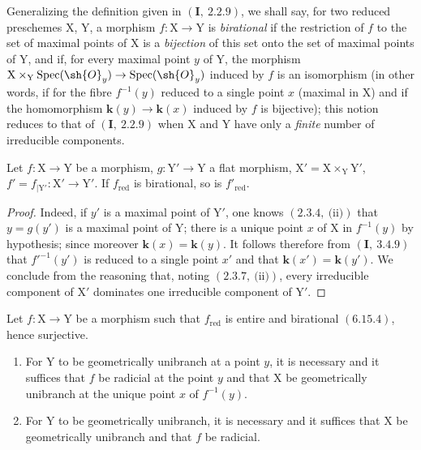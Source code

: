 \begin{env}[6.15.4]
\label{IV.6.15.4}
Generalizing the definition given in $(\mathbf{I},~2.2.9)$, we shall say,
for two reduced preschemes $\mathrm{X}$, $\mathrm{Y}$, a morphism $f:\mathrm{X}\to\mathrm{Y}$ is \emph{birational} if the restriction
of $f$ to the set of maximal points of $\mathrm{X}$ is a \emph{bijection} of this set onto
the set of maximal points of $\mathrm{Y}$, and if, for every maximal point $y$ of $\mathrm{Y}$, the
morphism $\mathrm{X}\times_\mathrm{Y}\operatorname{Spec}(\sh{O}_y)\to\operatorname{Spec}(\sh{O}_y)$ induced by $f$ is an isomorphism (in other words,
if for the fibre $f^{-1}(y)$ reduced to a single point $x$ (maximal in $\mathrm{X}$) and if the homomorphism
$\boldsymbol{k}(y)\to\boldsymbol{k}(x)$ induced by $f$ is bijective); this notion reduces to that of $(\mathbf{I},~2.2.9)$ when $\mathrm{X}$
and $\mathrm{Y}$ have only a \emph{finite} number of irreducible components.
\end{env}

\begin{lemma}[6.15.4.1]
\label{IV.6.15.4.1}
Let $f:\mathrm{X}\to\mathrm{Y}$ be a morphism, $g:\mathrm{Y}'\to\mathrm{Y}$ a flat morphism,
$\mathrm{X}'=\mathrm{X}\times_\mathrm{Y}\mathrm{Y}'$, $f'=f_{|\mathrm{Y}'}:\mathrm{X}'\to\mathrm{Y}'$. If $f_{\mathrm{red}}$ is birational, so is $f'_{\mathrm{red}}$.
\end{lemma}

\begin{proof}
Indeed, if $y'$ is a maximal point of $\mathrm{Y}'$, one knows $(2.3.4,~\text{(ii)})$ that $y=g(y')$ is
a maximal point of $\mathrm{Y}$; there is a unique point $x$ of $\mathrm{X}$ in $f^{-1}(y)$ by hypothesis; since moreover
$\boldsymbol{k}(x)=\boldsymbol{k}(y)$. It follows therefore from $(\mathbf{I},~3.4.9)$ that
$f'^{-1}(y')$ is reduced to a single point $x'$ and that $\boldsymbol{k}(x')=\boldsymbol{k}(y')$. We conclude from the reasoning
that, noting $(2.3.7,~\text{(ii)})$, every irreducible component of $\mathrm{X}'$ dominates
one irreducible component of $\mathrm{Y}'$.
\end{proof}

\begin{proposition}[6.15.5]
\label{IV.6.15.5}
Let $f:\mathrm{X}\to\mathrm{Y}$ be a morphism such that $f_{\mathrm{red}}$ is entire and birational
$(6.15.4)$, hence surjective.
\begin{enumerate}[label=(\roman*)]
  \item For $\mathrm{Y}$ to be geometrically unibranch at a point $y$, it is necessary and it suffices that $f$ be
radicial at the point $y$ and that $\mathrm{X}$ be geometrically unibranch at the unique point $x$ of $f^{-1}(y)$.
  \item For $\mathrm{Y}$ to be geometrically unibranch, it is necessary and it suffices that $\mathrm{X}$ be geometrically
unibranch and that $f$ be radicial.
\end{enumerate}
\end{proposition}

